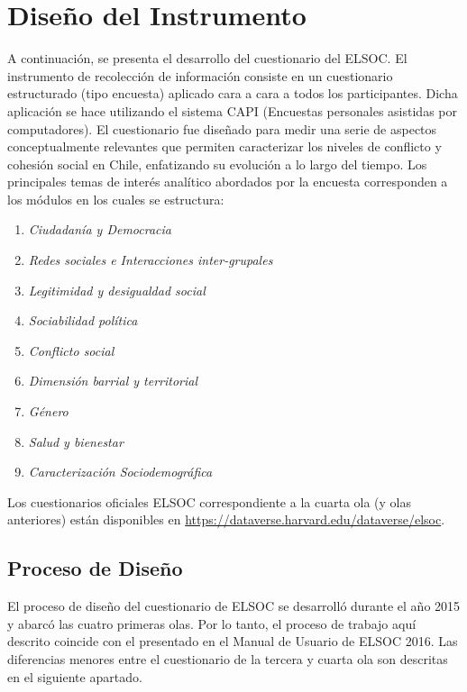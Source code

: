 \documentclass[
]{book}
\providecommand{\tightlist}{%
  \setlength{\itemsep}{0pt}\setlength{\parskip}{0pt}}
\begin{document}
\hypertarget{dis_ins}{%
\chapter{Diseño del Instrumento}\label{dis_ins}}

A continuación, se presenta el desarrollo del cuestionario del ELSOC. El instrumento de recolección de información consiste en un cuestionario estructurado (tipo encuesta) aplicado cara a cara a todos los participantes. Dicha aplicación se hace utilizando el sistema CAPI (Encuestas personales asistidas por computadores). El cuestionario fue diseñado para medir una serie de aspectos conceptualmente relevantes que permiten caracterizar los niveles de conflicto y cohesión social en Chile, enfatizando su evolución a lo largo del tiempo. Los principales temas de interés analítico abordados por la encuesta corresponden a los módulos en los cuales se estructura:

\begin{enumerate}
\def\labelenumi{\arabic{enumi}.}
\tightlist
\item
  \emph{Ciudadanía y Democracia}
\item
  \emph{Redes sociales e Interacciones inter-grupales}
\item
  \emph{Legitimidad y desigualdad social}
\item
  \emph{Sociabilidad política}
\item
  \emph{Conflicto social}
\item
  \emph{Dimensión barrial y territorial}
\item
  \emph{Género}
\item
  \emph{Salud y bienestar}
\item
  \emph{Caracterización Sociodemográfica}
\end{enumerate}

Los cuestionarios oficiales ELSOC correspondiente a la cuarta ola (y olas anteriores) están disponibles en \url{https://dataverse.harvard.edu/dataverse/elsoc}.

\hypertarget{proc-dis}{%
\section{Proceso de Diseño}\label{proc-dis}}

El proceso de diseño del cuestionario de ELSOC se desarrolló durante el año 2015 y abarcó las cuatro primeras olas. Por lo tanto, el proceso de trabajo aquí descrito coincide con el presentado en el Manual de Usuario de ELSOC 2016. Las diferencias menores entre el cuestionario de la tercera y cuarta ola son descritas en el siguiente apartado.
\end{document}

